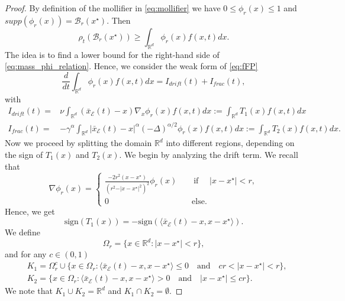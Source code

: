 \documentclass[10pt,a4paper]{amsart}
\def\RR{\mathbb R}
\begin{document}
\begin{proof}
	By definition of the mollifier in \eqref{eq:mollifier} we have $0\leq \phi_r(x)\leq 1$ and $supp (\phi_r(x)) = \mathcal{B}_r(x^\star)$. Then 
	\begin{equation}\label{eq:mass_phi_relation}
		\rho_t(\mathcal{B}_r(x^\star)) \geq \int_{\RR^d} \phi_r(x) f(x,t) dx. 
	\end{equation}
	The idea is to find a lower bound for the right-hand side of \eqref{eq:mass_phi_relation}. Hence, we consider the weak form of \eqref{eq:fFP}
	\begin{equation*}
		\frac{d}{dt} \int_{\RR^d} \phi_r(x) f(x,t) dx = I_{drift}(t) + I_{frac}(t),
	\end{equation*}
	with
	\begin{equation*}
		\begin{split}
			I_{drift}(t) = & \nu \int_{\RR^d}  (\bar{x}_\mathcal{E}(t)-x) \nabla_x \phi_r(x) f(x,t) dx := \int_{\RR^d} T_1(x) f(x,t) dx \\
			I_{frac}(t) = & -\gamma^\alpha \int_{\RR^d} \vert \bar{x}_\mathcal{E}(t)-x\vert^\alpha (-\Delta)^{\alpha/2} \phi_r(x) f(x,t) dx := \int_{\RR^d} T_2(x) f(x,t) dx.
		\end{split}
	\end{equation*}
	Now we proceed by splitting the domain $\RR^d$ into different regions, depending on the sign of $T_1(x)$ and $T_2(x)$. 
	We begin by analyzing the drift term. We recall that 
	\begin{equation*}
		\nabla \phi_r(x) = \begin{cases}
			\frac{-2 r^2 (x-x^\star) }{(r^2 - \vert x-x^\star\vert^2)^2} \phi_r(x)  \qquad \text{if } \quad \vert x-x^\star \vert < r,\\
			0  \qquad  \qquad \qquad \qquad \qquad  \text{else}.
		\end{cases}
	\end{equation*}
	Hence, we get
	\begin{equation*}
		\text{sign}(T_1(x)) = - \text{sign}( \langle \bar{x}_\mathcal{E}(t)-x, x-x^\star\rangle). 
	\end{equation*}
	We define 
	\begin{equation*}
		\Omega_r = \{ x\in \RR^d : \vert x-x^\star\vert < r\},
	\end{equation*}
	and for any $c\in (0,1)$
	\begin{equation}
		\begin{split}
			& K_1 = \Omega_r^c \cup \{ x\in \Omega_r : \langle \bar{x}_\mathcal{E}(t)-x, x-x^\star\rangle \leq 0 \quad \text{and} \quad c r<\vert x-x^\star \vert < r \},\\
			& K_2 = \{ x\in \Omega_r : \langle \bar{x}_\mathcal{E}(t)-x, x-x^\star\rangle > 0 \quad \text{and} \quad \vert x-x^\star \vert \leq c r\}.
		\end{split}
	\end{equation}
	We note that $K_1 \cup K_2 = \RR^d$ and $K_1\cap K_2 = \emptyset$. 

\end{proof}
\end{document}
